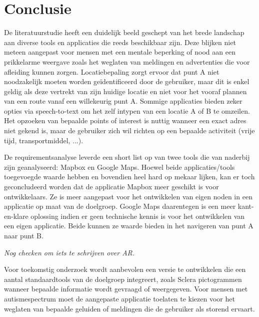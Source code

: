 
\chapter{Conclusie}%
\label{ch:conclusie}



De literatuurstudie heeft een duidelijk beeld geschept van het brede landschap aan diverse tools en applicaties die reeds beschikbaar zijn. Deze blijken niet meteen aangepast voor mensen met een mentale beperking of nood aan een prikkelarme weergave zoals het weglaten van meldingen en advertenties die voor afleiding kunnen zorgen. Locatiebepaling zorgt ervoor dat punt A niet noodzakelijk moeten worden geïdentificeerd door de gebruiker, maar dit is enkel geldig als deze vertrekt van zijn huidige locatie en niet voor het vooraf plannen van een route vanaf een willekeurig punt A. Sommige applicaties bieden zeker opties via speech-to-text om het zelf intypen van een locatie A of B te omzeilen. Het opzoeken van bepaalde points of interest is nuttig wanneer een exact adres niet gekend is, maar de gebruiker zich wil richten op een bepaalde activiteit (vrije tijd, transportmiddel, ...).  

De requirementsanalyse leverde een short list op van twee tools die van naderbij zijn geanalyseerd: Mapbox en Google Maps. Hoewel beide applicaties/tools toegevoegde waarde hebben en bovendien heel hard op mekaar lijken, kan er toch geconcludeerd worden dat de applicatie Mapbox meer geschikt is voor ontwikkelaars. Ze is meer aangepast voor het ontwikkelen van eigen noden in een applicatie op maat van de doelgroep. Google Maps daarentegen is een meer kant-en-klare oplossing indien er geen technische kennis is voor het ontwikkelen van een eigen applicatie. Beide kunnen ze waarde bieden in het navigeren van punt A naar punt B.

\textit{Nog checken om iets te schrijven over AR.}

Voor toekomstig onderzoek wordt aanbevolen een versie te ontwikkelen die een aantal standaardtools van de doelgroep integreert, zoals Sclera pictogrammen wanneer bepaalde informatie wordt gevraagd of weergegeven. Voor mensen met autismespectrum moet de aangepaste applicatie toelaten te kiezen voor het weglaten van bepaalde geluiden of meldingen die de gebruiker als storend ervaart. 